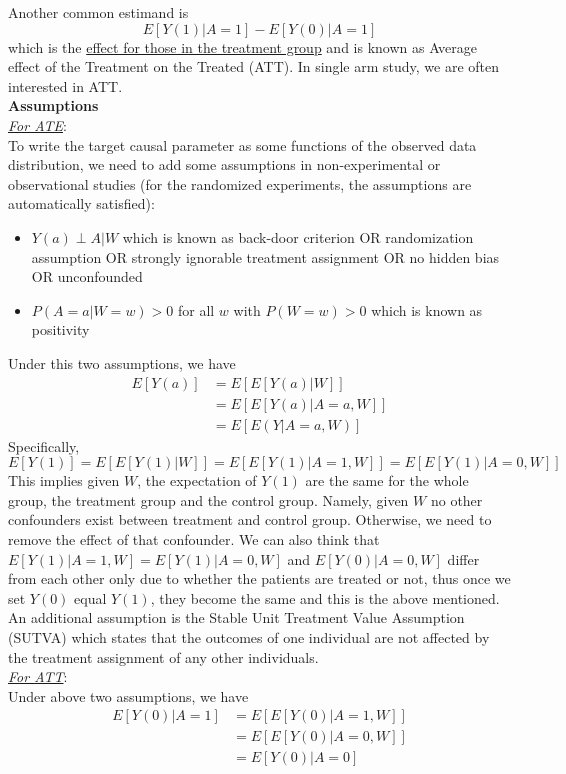 \documentclass{article}
\begin{document}
Another common estimand is 
$$E[Y(1)|A=1]-E[Y(0)|A=1]$$
which is the \textsf{\underline{effect for those in the treatment group}} and is known as Average effect of the Treatment on the Treated (ATT). In single arm study, we are often interested in ATT.\\[2mm]
\textbf{Assumptions}\\
\emph{\underline{For ATE}}:\\
To write the target causal parameter as some functions of the observed data distribution, we need to add some assumptions in non-experimental or observational studies (for the randomized experiments, the assumptions are automatically satisfied):
\begin{itemize}
\item $Y(a)\perp A|W$ which is known as back-door criterion OR randomization assumption OR strongly ignorable treatment assignment OR no hidden bias OR unconfounded
\item $P(A = a|W = w)>0$ for all $w$ with $P(W=w)>0$ which is known as positivity
\end{itemize}
Under this two assumptions, we have
\begin{align*}
E[Y(a)] & =E[E[Y(a)|W]]\\
           & =E[E[Y(a)|A=a, W]]\\
           & =E[E(Y|A=a, W)]
\end{align*}
Specifically,
$$E[Y(1)]=E[E[Y(1)|W]]=E[E[Y(1)|A=1, W]]=E[E[Y(1)|A=0, W]]$$
This implies given $W$, the expectation of $Y(1)$ are the same for the whole group, the treatment group and the control group. Namely, given $W$ no other confounders exist between treatment and control group. Otherwise, we need to remove the effect of that confounder. We can also think that $E[Y(1)|A=1, W]=E[Y(1)|A=0, W]$ and $E[Y(0)|A=0, W]$ differ from each other only due to whether the patients are treated or not, thus once we set $Y(0)$ equal $Y(1)$, they become the same and this is the above mentioned.\\
An additional assumption is the Stable Unit Treatment Value Assumption (SUTVA) which states that the outcomes of one individual are not affected by the treatment assignment of any other individuals.\\[2mm]
\emph{\underline{For ATT}}:\\
Under above two assumptions, we have
\begin{align*}
E[Y(0)|A=1] & =E[E[Y(0)|A=1, W]]\\
                   & =E[E[Y(0)|A=0, W]]\\
                   & =E[Y(0)|A=0]
\end{align*}
\end{document}
